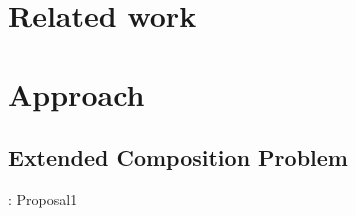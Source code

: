 \documentclass[senior,final,11pt]{iscs-thesis}
\begin{document}
\chapter{Related  work}


\chapter{Approach}%

\section{Extended Composition Problem}: Proposal1 %
\end{document}

